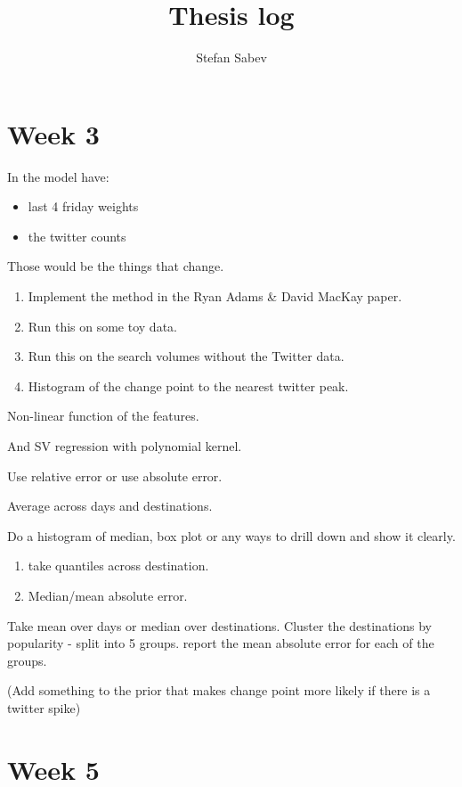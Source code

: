 \documentclass[11pt]{amsart}
\title{Thesis log}
\author{Stefan Sabev}
\begin{document}
\maketitle

\section{Week 3}

In the model have:
\begin{itemize}
\item last 4 friday weights
\item the twitter counts
\end{itemize}

Those would be the things that change.

\begin{enumerate}
\item Implement the method in the Ryan Adams \& David MacKay paper.
\item Run this on some toy data.
\item Run this on the search volumes without the Twitter data.
\item Histogram of the change point to the nearest twitter peak.
\end{enumerate}

Non-linear function of the features.

And SV regression with polynomial kernel.

Use relative error or use absolute error.

Average across days and destinations. 

Do a histogram of median, box plot or any ways to drill down and show it clearly.
\begin{enumerate}
\item take quantiles across destination. 
\item Median/mean absolute error.
\end{enumerate}

Take mean over days or median over destinations.
Cluster the destinations by popularity - split into 5 groups.
report the mean absolute error for each of the groups.

(Add something to the prior that makes change point more likely if there is a twitter spike)

\section{Week 5}
\end{document}
